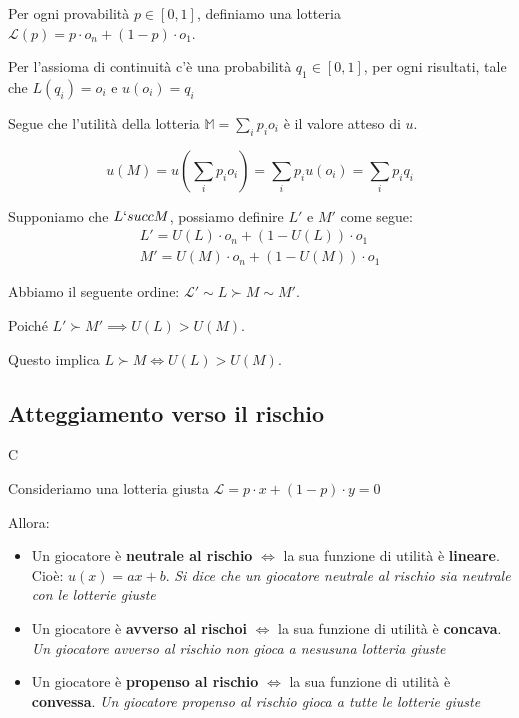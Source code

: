 Per ogni provabilità $p \in [0,1]$, definiamo una lotteria $\mathcal{L}(p) = p
    \cdot o_n + (1-p) \cdot o_1$.

Per l'assioma di continuità c'è una probabilità $q_1 \in [0,1]$, per ogni
risultati, tale che $L(q_i) = o_i$ e $u(o_i) = q_i$

Segue che l'utilità della lotteria $\mathbb{M} = \sum_i p_i o_i$ è il valore
atteso di $u$.

\[
    u(M) = u(\sum_i p_i o_i) = \sum_i p_i u(o_i) = \sum_i p_i q_i
\]

\begin{dimostrazione}
\end{dimostrazione}

Supponiamo che $L `succ M$, possiamo definire $L'$ e $M'$ come segue:
\[
    \begin{aligned}
        L' = U(L) \cdot o_n + (1-U(L)) \cdot o_1 \\
        M' = U(M) \cdot o_n + (1-U(M)) \cdot o_1
    \end{aligned}
\]

Abbiamo il seguente ordine: $\mathcal{L}' \sim L \succ M \sim M'$.

Poiché $L' \succ M' \implies U(L) > U(M)$.

Questo implica $ L \succ M \iff U(L) > U(M)$.

\subsection{Atteggiamento verso il rischio}C

Consideriamo una lotteria giusta $\mathcal{L} = p \cdot x + (1-p) \cdot y = 0$

Allora:

\begin{itemize}
    \item Un giocatore è \textbf{neutrale al rischio} $\iff$ la sua funzione di utilità è
          \textbf{lineare}. Cioè: $u(x) = ax + b$. \textit{Si dice che un giocatore
              neutrale al rischio sia neutrale con le lotterie giuste }
    \item Un giocatore è \textbf{avverso al rischoi} $\iff$ la sua funzione di utilità è
          \textbf{concava}. \textit{Un giocatore avverso al rischio non gioca a nesusuna
              lotteria giuste}
    \item Un giocatore è \textbf{propenso al rischio} $\iff$ la sua funzione di utilità è
          \textbf{convessa}. \textit{Un giocatore propenso al rischio gioca a tutte le
              lotterie giuste}
\end{itemize}

